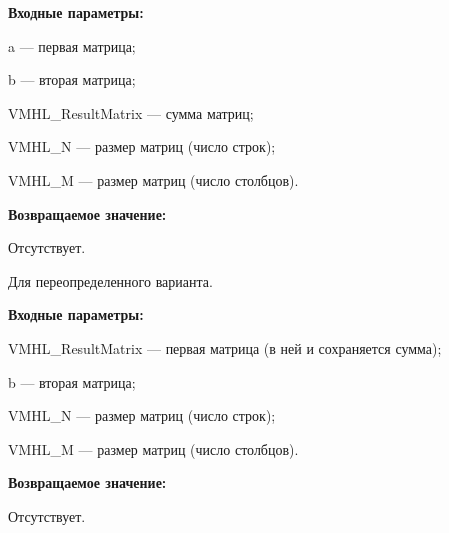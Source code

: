 \documentclass[a4paper,12pt]{article}
\begin{document}
\textbf{Входные параметры:}

 a --- первая матрица;
 
 b --- вторая матрица;
 
 VMHL\_ResultMatrix --- сумма матриц;
 
 VMHL\_N --- размер матриц (число строк);
 
 VMHL\_M --- размер матриц (число столбцов).

\textbf{Возвращаемое значение:}

Отсутствует.

Для переопределенного варианта.

\textbf{Входные параметры:}

 VMHL\_ResultMatrix --- первая матрица (в ней и сохраняется сумма);
 
 b --- вторая матрица;
 
 VMHL\_N --- размер матриц (число строк);
 
 VMHL\_M --- размер матриц (число столбцов).
 
 \textbf{Возвращаемое значение:}

Отсутствует.
\end{document}

